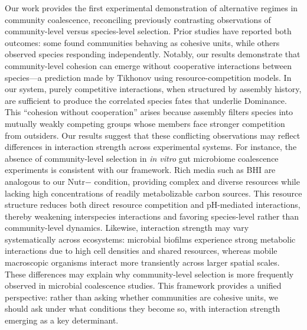 Our work provides the first experimental demonstration of alternative regimes in community coalescence, reconciling previously contrasting observations of community-level versus species-level selection. Prior studies have reported both outcomes: some found communities behaving as cohesive units\citep{Tikhonov2016, DiazColunga2022}, while others observed species responding independently\citep{VanderGucht2007, Vermeij1991}. Notably, our results demonstrate that community-level cohesion can emerge without cooperative interactions between species---a prediction made by Tikhonov\citep{Tikhonov2016} using resource-competition models. In our system, purely competitive interactions, when structured by assembly history, are sufficient to produce the correlated species fates that underlie Dominance. This ``cohesion without cooperation'' arises because assembly filters species into mutually weakly competing groups whose members face stronger competition from outsiders.  Our results suggest that these conflicting observations may reflect differences in interaction strength across experimental systems. For instance, the absence of community-level selection in \textit{in vitro} gut microbiome coalescence experiments\citep{Goldman2025, Walton2025} is consistent with our framework. Rich media such as BHI are analogous to our Nutr$-$ condition, providing complex and diverse resources while lacking high concentrations of readily metabolizable carbon sources. This resource structure reduces both direct resource competition and pH-mediated interactions, thereby weakening interspecies interactions\citep{Ratzke2020} and favoring species-level rather than community-level dynamics. Likewise, interaction strength may vary systematically across ecosystems: microbial biofilms experience strong metabolic interactions due to high cell densities and shared resources\citep{Nadell2016}, whereas mobile macroscopic organisms interact more transiently across larger spatial scales. These differences may explain why community-level selection is more frequently observed in microbial coalescence studies. This framework provides a unified perspective: rather than asking whether communities are cohesive units, we should ask under what conditions they become so, with interaction strength emerging as a key determinant.


